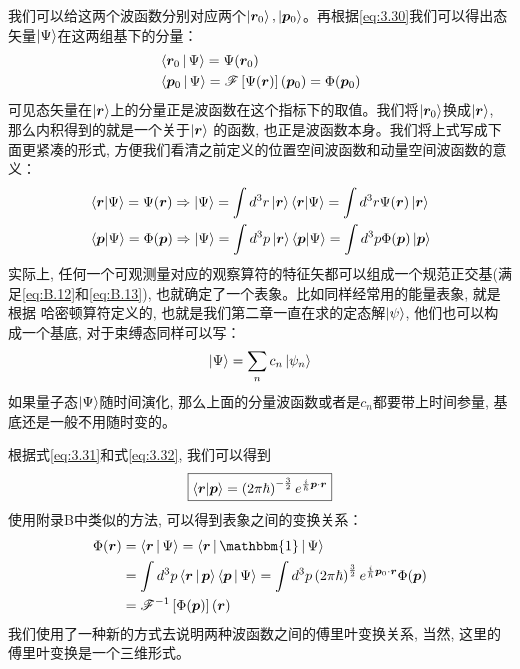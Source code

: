\documentclass[a4paper,zihao=-4,linespread=1]{ctexrep}
\begin{document}
    我们可以给这两个波函数分别对应两个$\ket{\bm{r}_0},\ket{\bm{p}_0}$。再根据\ref{eq:3.30}我们可以得出态矢量$\Ket{\Psi}$在这两组基下的分量：
    \begin{align}
        &\Braket{\bm{r}_0|\Psi}=\Psi(\bm{r}_0)\\
        &\Braket{\bm{p}_0|\Psi}=\mathscr{F}\left[\Psi(\bm{r})\right](\bm{p}_0)=\Phi(\bm{p}_0)
    \end{align}
    可见态矢量在$\ket{\bm{r}}$上的分量正是波函数在这个指标下的取值。我们将$\ket{\bm{r}_0}$换成$\ket{\bm{r}}$, 那么内积得到的就是一个关于$\ket{\bm{r}}$
    的函数, 也正是波函数本身。我们将上式写成下面更紧凑的形式, 方便我们看清之前定义的位置空间波函数和动量空间波函数的意义：
    \begin{align}
        &\braket{\bm{r}|\Psi}=\Psi(\bm{r})\Rightarrow \ket{\Psi}=\int d^3r \ket{\bm{r}}\braket{\bm{r}|\Psi}=\int d^3r \Psi(\bm{r})\ket{\bm{r}}\\
        &\braket{\bm{p}|\Psi}=\Phi(\bm{p})\Rightarrow \ket{\Psi}=\int d^3p \ket{\bm{r}}\braket{\bm{p}|\Psi}=\int d^3p \Phi(\bm{p})\ket{\bm{p}}
    \end{align}
    实际上, 任何一个可观测量对应的观察算符的特征矢都可以组成一个规范正交基(满足\ref{eq:B.12}和\ref{eq:B.13}), 也就确定了一个表象。比如同样经常用的能量表象, 就是根据
    哈密顿算符定义的, 也就是我们第二章一直在求的定态解$\ket{\psi}$, 他们也可以构成一个基底, 对于束缚态同样可以写：
    \[\ket{\Psi}=\sum\limits_n c_n\ket{\psi_n}\]  
    如果量子态$\ket{\Psi}$随时间演化, 那么上面的分量波函数或者是$c_n$都要带上时间参量, 基底还是一般不用随时变的。
    
    根据式\ref{eq:3.31}和式\ref{eq:3.32}, 我们可以得到
    \begin{equation}
    	\label{eq:r-p}
    	\boxed{
    	\braket{\bm{r}|\bm{p}}=\left(2\pi\hbar\right)^{-\frac{3}{2}}e^{\frac{i}{\hbar}\bm{p}\cdot\bm{r}}
    }
    \end{equation}
    使用附录B中类似的方法, 可以得到表象之间的变换关系：
    \begin{align*}
        \Phi(\bm{r})&=\Braket{\bm{r}|\Psi}=\Braket{\bm{r}|\mathbbm{1}|\Psi}\\
        &=\int d^3p\Braket{\bm{r}|\bm{p}}\Braket{\bm{p}|\Psi}=\int d^3p\left(2\pi\hbar\right)^{\frac{3}{2}}e^{\frac{i}{\hbar}\bm{p}_0\cdot\bm{r}}\Phi(\bm{p})\\
        &=\mathscr{F}^{-1}\left[\Phi(\bm{p})\right](\bm{r})
    \end{align*}
    我们使用了一种新的方式去说明两种波函数之间的傅里叶变换关系, 当然, 这里的傅里叶变换是一个三维形式。
\end{document}

